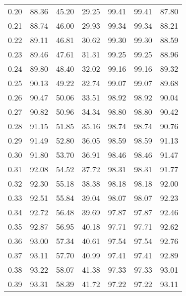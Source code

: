 \begin{tabular}{|c|c|c|c|c|c|c|}
      0.20 &     88.36 &     45.20 &      29.25 &   99.41 &      99.41 &         87.80 \\
      0.21 &     88.74 &     46.00 &      29.93 &   99.34 &      99.34 &         88.21 \\
      0.22 &     89.11 &     46.81 &      30.62 &   99.30 &      99.30 &         88.59 \\
      0.23 &     89.46 &     47.61 &      31.31 &   99.25 &      99.25 &         88.96 \\
      0.24 &     89.80 &     48.40 &      32.02 &   99.16 &      99.16 &         89.32 \\
      0.25 &     90.13 &     49.22 &      32.74 &   99.07 &      99.07 &         89.68 \\
      0.26 &     90.47 &     50.06 &      33.51 &   98.92 &      98.92 &         90.04 \\
      0.27 &     90.82 &     50.96 &      34.34 &   98.80 &      98.80 &         90.42 \\
      0.28 &     91.15 &     51.85 &      35.16 &   98.74 &      98.74 &         90.76 \\
      0.29 &     91.49 &     52.80 &      36.05 &   98.59 &      98.59 &         91.13 \\
      0.30 &     91.80 &     53.70 &      36.91 &   98.46 &      98.46 &         91.47 \\
      0.31 &     92.08 &     54.52 &      37.72 &   98.31 &      98.31 &         91.77 \\
      0.32 &     92.30 &     55.18 &      38.38 &   98.18 &      98.18 &         92.00 \\
      0.33 &     92.51 &     55.84 &      39.04 &   98.07 &      98.07 &         92.23 \\
      0.34 &     92.72 &     56.48 &      39.69 &   97.87 &      97.87 &         92.46 \\
      0.35 &     92.87 &     56.95 &      40.18 &   97.71 &      97.71 &         92.62 \\
      0.36 &     93.00 &     57.34 &      40.61 &   97.54 &      97.54 &         92.76 \\
      0.37 &     93.11 &     57.70 &      40.99 &   97.41 &      97.41 &         92.89 \\
      0.38 &     93.22 &     58.07 &      41.38 &   97.33 &      97.33 &         93.01 \\
      0.39 &     93.31 &     58.39 &      41.72 &   97.22 &      97.22 &         93.11 \\

\end{tabular}
